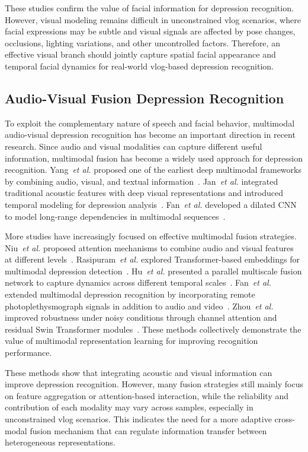 \documentclass[a4paper,fleqn]{cas-dc}
\begin{document}
These studies confirm the value of facial information for depression recognition. However,  visual modeling remains difficult in unconstrained vlog scenarios, where facial expressions may be subtle and visual signals are affected by pose changes, occlusions, lighting variations, and other uncontrolled factors. Therefore, an effective visual branch should jointly capture spatial facial appearance and temporal facial dynamics for real-world vlog-based depression recognition.

\subsection{Audio-Visual Fusion Depression Recognition}
To exploit the complementary nature of speech and facial behavior, multimodal audio-visual depression recognition has become an important direction in recent research.
Since audio and visual modalities can capture different useful information, multimodal fusion has become a widely used approach for depression recognition. Yang~\textit{et al.} proposed one of the earliest deep multimodal frameworks by combining audio, visual, and textual information~\cite{research:video_1}. Jan~\textit{et al.} integrated traditional acoustic features with deep visual representations and introduced temporal modeling for depression analysis~\cite{research:video_2}. Fan~\textit{et al.} developed a dilated CNN to model long-range dependencies in multimodal sequences~\cite{research:video_3}.

More studies have increasingly focused on effective multimodal fusion strategies. 
Niu~\textit{et al.}  proposed attention mechanisms to combine audio and visual features at different levels~\cite{research:audio_3}. Rasipuram~\textit{et al.} explored Transformer-based embeddings for multimodal depression detection~\cite{Rasipuram2022TaskTransformer}. Hu~\textit{et al.} presented a parallel multiscale fusion network to capture dynamics across different temporal scales~\cite{Hu2023PMBFN}. Fan~\textit{et al.} extended multimodal depression recognition by incorporating remote photoplethysmograph signals in addition to audio and video~\cite{Fan2024TMFEGFN}. Zhou~\textit{et al.} improved robustness under noisy conditions through channel attention and residual Swin Transformer modules~\cite{research:video_5}. These methods collectively demonstrate the value of multimodal representation learning for improving recognition performance.


These methods show that integrating acoustic and visual information can improve depression recognition. However, many fusion strategies still mainly focus on feature aggregation or attention-based interaction, while the reliability and contribution of each modality may vary across samples, especially in unconstrained vlog scenarios. This indicates the need for a more adaptive cross-modal fusion mechanism that can regulate information transfer between heterogeneous representations.
\end{document}
